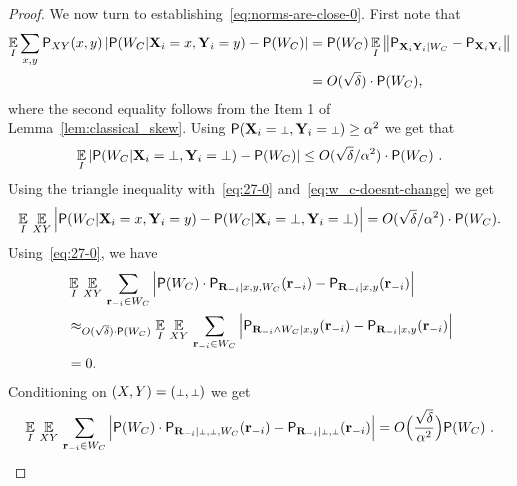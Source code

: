 \begin{proof}
We now turn to establishing~\eqref{eq:norms-are-close-0}.
%
First note that
\begin{align}
\nonumber
\operatorname*{\mathbb{E}}_I \sum_{x,y} \mathsf{P}_{XY}(x,y) \left | \mathsf{P} (W_C| \mathbf{X}_i = x,\mathbf{Y}_i = y)-\mathsf{P}(W_C) \right |
&= \mathsf{P}(W_C) \operatorname*{\mathbb{E}}_I  \left \| \mathsf{P}_{\mathbf{X}_i \mathbf{Y}_i |W_C} - \mathsf{P}_{\mathbf{X}_i\mathbf{Y}_i} \right \| \\
\label{eq:27-0}
&= O(\sqrt{\delta}) \cdot \mathsf{P}(W_C),
\end{align}
where the second equality follows from the Item 1 of Lemma~\ref{lem:classical_skew}. Using $\P(\bX_i = \dummy, \bY_i = \dummy) \geq \alpha^2$ we get that
\begin{equation}
\label{eq:w_c-doesnt-change}
\Ex_I \left | \P (W_C| \bX_i = \dummy,\bY_i = \dummy)-\P(W_C) \right | \leq O(\sqrt{\delta}/\alpha^2) \cdot \P(W_C)~.
\end{equation}
Using the triangle inequality with~\eqref{eq:27-0} and~\eqref{eq:w_c-doesnt-change} we get
\begin{equation}\label{eq:27-1}
\Ex_I \, \Ex_{XY} \Big | \P(W_C| \bX_i = x,\bY_i = y)-\P(W_C | \bX_i = \dummy, \bY_i = \dummy) \Big | = O(\sqrt{\delta}/\alpha^2) \cdot \P(W_C).
\end{equation}
Using~\eqref{eq:27-0}, we have 
\begin{align*}
&\operatorname*{\mathbb{E}}_I \, \operatorname*{\mathbb{E}}_{XY} \, \sum_{\mathbf{r}_{-i} \in W_C} \Big | \mathsf{P}(W_C) \cdot \mathsf{P}_{\mathbf{R}_{-i} | x, y, W_C}(\mathbf{r}_{-i}) - \mathsf{P}_{\mathbf{R}_{-i} | x,y} (\mathbf{r}_{-i}) \Big | \\
 &\approx_{O(\sqrt{\delta}) \cdot \mathsf{P}(W_C)} \operatorname*{\mathbb{E}}_I \, \operatorname*{\mathbb{E}}_{XY} \, \sum_{\mathbf{r}_{-i} \in W_C} \Big |  \mathsf{P}_{\mathbf{R}_{-i} \wedge W_C | x,y}(\mathbf{r}_{-i}) - \mathsf{P}_{\mathbf{R}_{-i} | x,y}(\mathbf{r}_{-i})  \Big | \\
&= 0.
\end{align*}
Conditioning on $(X,Y) = (\dummy,\dummy)$ we get
\begin{align*}
\Ex_I \, \Ex_{XY} \, \sum_{\br_\mi\in W_C} \Big | \P(W_C) \cdot \P_{\bR_\mi |  \dummy,  \dummy, W_C}(\br_\mi) - \P_{\bR_\mi |\dummy,  \dummy}(\br_\mi)  \Big | = O\Big(\frac{\sqrt{\delta}}{\alpha^2}\Big) \P(W_C)~.
\end{align*}

\end{proof}
